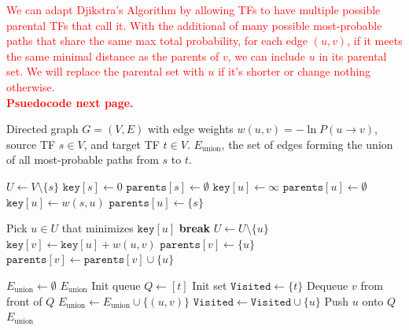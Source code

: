 \documentclass[11pt]{article}
\begin{document}
\textcolor{red}{
We can adapt Djikstra's Algorithm by allowing TFs to have multiple possible parental TFs that call it. With the additional of many possible most-probable paths that share the same max total probability, for each edge $(u, v)$, if it meets the same minimal distance as the parents of $v$, we can include $u$ in its parental set. We will replace the parental set with $u$ if it's shorter or change nothing otherwise.\\
\textbf{Psuedocode next page.}
}

\begin{algorithm}
\caption{Most-Probable Regulatory Chain}
\begin{algorithmic}
\Require Directed graph $G = (V, E)$ with edge weights $w(u, v) = -\ln P(u \to v)$, source TF $s \in V$, and target TF $t \in V$.
\Ensure $E_{\text{union}}$, the set of edges forming the union of all most-probable paths from $s$ to $t$.

\State {}
\State $U \gets V \setminus \{s\}$
\State $\texttt{key}[s] \gets 0$
\State $\texttt{parents}[s] \gets \emptyset$
    \State $\texttt{key}[u] \gets \infty$
    \State $\texttt{parents}[u] \gets \emptyset$
\EndFor
{}
    \State $\texttt{key}[u] \gets w(s, u)$
    \State $\texttt{parents}[u] \gets \{s\}$
\EndFor

    \State Pick $u \in U$ that minimizes $\texttt{key}[u]$
        \State \textbf{break} 
    \EndIf
    \State $U \gets U \setminus \{u\}$
                \State $\texttt{key}[v] \gets \texttt{key}[u] + w(u, v)$
                \State $\texttt{parents}[v] \gets \{u\}$ 
                \State $\texttt{parents}[v] \gets \texttt{parents}[v] \cup \{u\}$ 
            \EndIf
        \EndIf
    \EndFor
\EndWhile

\State {}
\State $E_{\text{union}} \gets \emptyset$
    \State \Return $E_{\text{union}}$ 
\EndIf
\State Init queue $Q \gets [t]$
\State Init set $\texttt{Visited} \gets \{t\}$
    \State Dequeue $v$ from front of $Q$
        \State $E_{\text{union}} \gets E_{\text{union}} \cup \{(u, v)\}$
            \State $\texttt{Visited} \gets \texttt{Visited} \cup \{u\}$
            \State Push $u$ onto $Q$
        \EndIf
    \EndFor
\EndWhile
\State \Return $E_{\text{union}}$
\end{algorithmic}
\end{algorithm}
\end{document}
